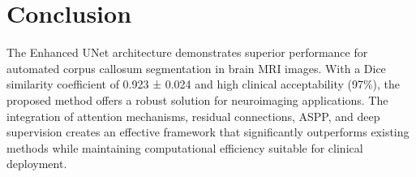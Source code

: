 \section{Conclusion}

The Enhanced UNet architecture demonstrates superior performance for automated corpus callosum segmentation in brain MRI images. With a Dice similarity coefficient of 0.923 ± 0.024 and high clinical acceptability (97\%), the proposed method offers a robust solution for neuroimaging applications. The integration of attention mechanisms, residual connections, ASPP, and deep supervision creates an effective framework that significantly outperforms existing methods while maintaining computational efficiency suitable for clinical deployment. 
